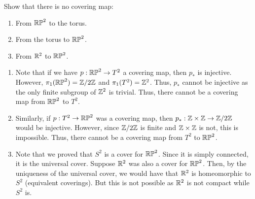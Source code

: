 \documentclass[12pt]{article}
\begin{document}
\begin{problem}{5}
    Show that there is no covering map:
    \begin{enumerate} 
    \item From $\mathbb{RP}^2$ to the torus.
    \item From the torus to $\mathbb{RP}^2$.
    \item From $\mathbb R^2$ to $\mathbb{RP}^2$.
    \end{enumerate}
\end{problem}
\begin{solution}
    \bbni
    \begin{enumerate}
        \item Note that if we have $p: \mathbb{RP}^2 \to T^2$ a covering map, then $p_*$ is injective. However, $\pi_1(\mathbb{RP}^2) = \mathbb Z/2\mathbb Z$ and $\pi_1(T^2) = \mathbb Z^2$. Thus, $p_*$ cannot be injective as the only finite subgroup of $\mathbb Z^2$ is trivial. Thus, there cannot be a covering map from $\mathbb{RP}^2$ to $T^2$.
        \item Similarly, if $p: T^2 \to \mathbb{RP}^2$ was a covering map, then $p_*: \mathbb Z \times \mathbb Z \to \mathbb Z/2\mathbb Z$ would be injective. However, since $\mathbb Z/2\mathbb Z$ is finite and $\mathbb Z \times \mathbb Z$ is not, this is impossible. Thus, there cannot be a covering map from $T^2$ to $\mathbb{RP}^2$.
        \item Note that we proved that $S^2$ is a cover for $\mathbb{RP}^2$. Since it is simply connected, it is the universal cover. Suppose $\mathbb R^2$ was also a cover for $\mathbb{RP}^2$. Then, by the uniqueness of the universal cover, we would have that $\mathbb R^2$ is homeomorphic to $S^2$ (equivalent coverings). But this is not possible as $\mathbb R^2$ is not compact while $S^2$ is.
    \end{enumerate}
\end{solution}
\end{document}
